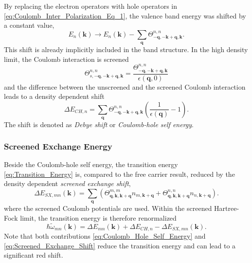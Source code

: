 By replacing the electron operators with hole operators in \ref{eq:Coulomb_Inter_Polarization_Eq_1},
the valence band energy was shifted by a constant value,\begin{equation}
E_{n}(\mathbf{k})\rightarrow E_{n}(\mathbf{k})-\sum_{\mathbf{q}}\Theta_{-\mathbf{q},-\mathbf{k}+\mathbf{q},\mathbf{k}}^{n,n}.\end{equation}
This shift is already implicitly included in the band structure. In
the high density limit, the Coulomb interaction is screened\begin{equation}
\Theta_{s,-\mathbf{q},-\mathbf{k}+\mathbf{q},\mathbf{k}}^{n,n}=\frac{\Theta_{-\mathbf{q},-\mathbf{k}+\mathbf{q},\mathbf{k}}^{n,n}}{\epsilon(\mathbf{q},0)}\end{equation}
and the difference between the unscreened and the screened Coulomb
interaction leads to a density dependent shift\begin{equation}
\Delta E_{CH,n}=\sum_{\mathbf{q}}\Theta_{-\mathbf{q},-\mathbf{k}+\mathbf{q},\mathbf{k}}^{n,n}\left(\frac{1}{\epsilon(\mathbf{q})}-1\right).\label{eq:Coulomb_Hole_Self_Energy}\end{equation}
The shift is denoted as \emph{Debye shift} or \emph{Coulomb-hole self
energy}.


\subsubsection{Screened Exchange Energy}

Beside the Coulomb-hole self energy, the transition energy \ref{eq:Transition_Energy}
is, compared to the free carrier result, reduced by the density dependent
\emph{screened exchange shift},\begin{equation}
\Delta E_{SX,mn}(\mathbf{k})=\sum_{\mathbf{q}}\left(\Theta_{\mathbf{q},\mathbf{k},\mathbf{k}+\mathbf{q}}^{m,m}n_{m,\mathbf{k}+\mathbf{q}}+\Theta_{\mathbf{q},\mathbf{k},\mathbf{k}+\mathbf{q}}^{n,n}n_{n,\mathbf{k}+\mathbf{q}}\right).\label{eq:Screened_Exchange_Shift}\end{equation}
where the screened Coulomb potentials are used. Within the screened
Hartree-Fock limit, the transition energy is therefore renormalized\begin{equation}
\hbar\tilde{\omega}_{mn}(\mathbf{k})=\Delta E_{mn}(\mathbf{k})+\Delta E_{CH,n}-\Delta E_{SX,mn}(\mathbf{k}).\label{eq:Band_Gap_Renormalization}\end{equation}
Note that both contributions \ref{eq:Coulomb_Hole_Self_Energy} and
\ref{eq:Screened_Exchange_Shift} reduce the transition energy and
can lead to a significant red shift.


